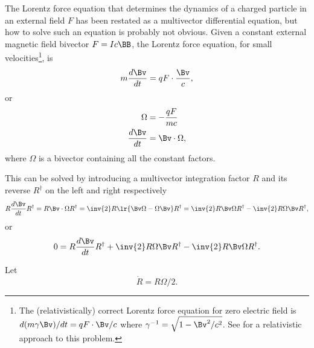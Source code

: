 %
%

The Lorentz force equation that determines the dynamics of a charged particle in an external field \( F \) has been restated as a multivector differential equation, but how to solve such an equation is probably not obvious.
Given a constant external magnetic field bivector \( F = I c \BB \), the Lorentz force equation, for small velocities\footnote{The (relativistically) correct Lorentz force equation for zero electric field is \( d(m \gamma \Bv)/dt = q F \cdot \Bv/c \) where \( \gamma^{-1} = \sqrt{1 - \Bv^2/c^2}\).  See \citep{doran2003gap} for a relativistic approach to this problem.}, is
\begin{dmath}\label{eqn:lorentzForce_constantMagnetic:60}
m \frac{d\Bv}{dt} = q F \cdot \frac{\Bv}{c},
\end{dmath}
or
\begin{dmath}\label{eqn:lorentzForce_constantMagnetic:80}
\begin{aligned}
\Omega &= -\frac{q F}{m c} \\
\frac{d\Bv}{dt} &= \Bv \cdot \Omega,
\end{aligned}
\end{dmath}
where \( \Omega \) is a bivector containing all the constant factors.

This can be solved by introducing a multivector integration factor \( R \) and its reverse \( R^\dagger \) on the left and right respectively
\begin{dmath}\label{eqn:lorentzForce_constantMagnetic:100}
R \frac{d\Bv}{dt} R^\dagger
= R \Bv \cdot \Omega R^\dagger
= \inv{2} R \lr{ \Bv \Omega - \Omega \Bv} R^\dagger
= \inv{2} R \Bv \Omega R^\dagger - \inv{2} R \Omega \Bv R^\dagger,
\end{dmath}
or
\begin{dmath}\label{eqn:lorentzForce_constantMagnetic:120}
0 =
R \frac{d\Bv}{dt} R^\dagger
+ \inv{2} R \Omega \Bv R^\dagger
- \inv{2} R \Bv \Omega R^\dagger.
\end{dmath}

Let
\begin{dmath}\label{eqn:lorentzForce_constantMagnetic:140}
\dot{R} = R \Omega/2.
\end{dmath}

